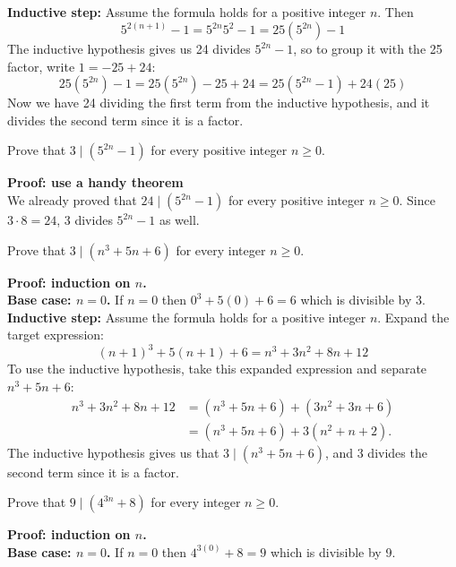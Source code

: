 \documentclass{article}
\begin{document}
\textbf{Inductive step:} Assume the formula holds for a positive integer $n$. Then
$$5^{2(n+1)} - 1 = 5^{2n}5^2 - 1 = 25(5^{2n}) - 1$$
The inductive hypothesis gives us 24 divides $5^{2n} - 1$, so to group it with the 25 factor, write $1 = -25 + 24$:
$$25(5^{2n}) - 1 = 25(5^{2n}) - 25 + 24 = 25(5^{2n} - 1) + 24(25)$$
Now we have 24 dividing the first term from the inductive hypothesis, and it divides the second term since it is a factor.

\begin{problem}
Prove that $3 \mid (5^{2n} - 1)$ for every positive integer $n \geq 0$.
\end{problem}

\textbf{Proof: use a handy theorem}
\\

We already proved that $24 \mid (5^{2n} - 1)$ for every positive integer $n \geq 0$. Since $3 \cdot 8 = 24$, 3 divides $5^{2n} - 1$ as well.

\begin{problem}
Prove that $3 \mid (n^3 + 5n + 6)$ for every integer $n \geq 0$.
\end{problem}

\textbf{Proof: induction on $n$.}
\\

\textbf{Base case: $n = 0$.} If $n = 0$ then $0^3 + 5(0) + 6 = 6$ which is divisible by 3.
\\

\textbf{Inductive step:} Assume the formula holds for a positive integer $n$. Expand the target expression:
$$(n+1)^3 + 5(n+1) + 6 = n^3 + 3n^2 + 8n + 12$$
To use the inductive hypothesis, take this expanded expression and separate $n^3 + 5n + 6$:
\begin{align*}
  n^3 + 3n^2 + 8n + 12 & = (n^3 + 5n + 6) + (3n^2 + 3n + 6) \\
                       & = (n^3 + 5n + 6) + 3(n^2 + n+2).
\end{align*}
The inductive hypothesis gives us that $3 \mid (n^3 + 5n + 6)$, and 3 divides the second term since it is a factor.

\begin{problem}
Prove that $9 \mid (4^{3n} + 8)$ for every integer $n \geq 0$.
\end{problem}

\textbf{Proof: induction on $n$.}
\\

\textbf{Base case: $n = 0$.} If $n = 0$ then $4^{3(0)} + 8 = 9$ which is divisible by 9.
\\
\end{document}
